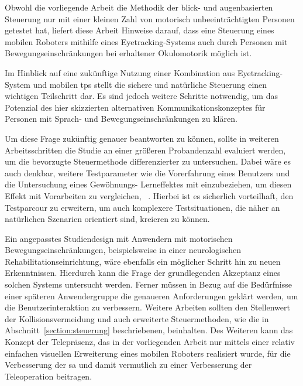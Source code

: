 Obwohl die vorliegende Arbeit die Methodik der blick- und augenbasierten Steuerung nur mit einer kleinen Zahl von motorisch unbeeinträchtigten Personen getestet hat, liefert diese Arbeit Hinweise darauf, dass eine Steuerung eines mobilen Roboters mithilfe eines Eyetracking-Systems auch durch Personen mit Bewegungseinschränkungen bei erhaltener Okulomotorik möglich ist.

Im Hinblick auf eine zukünftige Nutzung einer Kombination aus Eyetracking-System und mobilen \acl{tps} stellt die sichere und natürliche Steuerung einen wichtigen Teilschritt dar. Es sind jedoch weitere Schritte notwendig, um das Potenzial des hier skizzierten alternativen Kommunikationskonzeptes für Personen mit Sprach- und Bewegungseinschränkungen zu klären. 

Um diese Frage zukünftig genauer beantworten zu können, sollte in weiteren Arbeitsschritten die Studie an einer größeren Probandenzahl evaluiert werden, um die bevorzugte Steuermethode differenzierter zu untersuchen. Dabei wäre es auch denkbar, weitere Testparameter wie \zB die Vorerfahrung eines Benutzers und die Untersuchung eines Gewöhnungs- \bzw Lerneffektes mit einzubeziehen, um diesen Effekt mit Vorarbeiten zu vergleichen, \vgl~\cite{Casper2003}. Hierbei ist es sicherlich vorteilhaft, den Testparcour zu erweitern, um auch komplexere Testsituationen, die näher an natürlichen Szenarien orientiert sind, kreieren zu können. 

Ein angepasstes Studiendesign mit Anwendern mit motorischen Bewegungseinschränkungen, beispielsweise in einer neurologischen Rehabilitationseinrichtung, wäre ebenfalls ein möglicher Schritt hin zu neuen Erkenntnissen. Hierdurch kann die Frage der grundlegenden Akzeptanz eines solchen Systems untersucht werden. Ferner müssen in Bezug auf die Bedürfnisse einer späteren Anwendergruppe die genaueren Anforderungen geklärt werden, um die Benutzerinteraktion zu verbessern. Weitere Arbeiten sollten den Stellenwert der Kollisionsvermeidung und auch erweiterte Steuermethoden, wie die in Abschnitt~\ref{section:steuerung} beschriebenen, beinhalten. Des Weiteren kann das Konzept der Telepräsenz, das in der vorliegenden Arbeit nur mittels einer relativ einfachen visuellen Erweiterung eines mobilen Roboters realisiert wurde, für die Verbesserung der \acs{sa} und damit vermutlich zu einer Verbesserung der Teleoperation beitragen.


